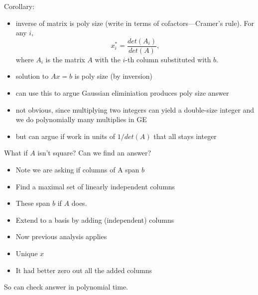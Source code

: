 \documentclass{article}
\begin{document}
Corollary:
\begin{itemize}
\item inverse of matrix is poly size (write in terms of cofactors---Cramer's rule). For any $i$,
\[
x_i^*=\frac{det(A_i)}{det(A)},
\]
where $A_i$ is the matrix $A$ with the $i$-th column substituted with $b$.
\item solution to $Ax=b$ is poly size (by inversion)
\item can use this to argue Gaussian eliminiation produces poly size
  answer 
\item not obvious, since multiplying two integers can yield a
  double-size integer and we do polynomially many multiplies in GE
\item but can argue if work in units of $1/det(A)$ that all stays integer
\end{itemize}

What if $A$ isn't square?  Can we find an answer?
\begin{itemize}
\item Note we are asking if columns of A span $b$
\item Find a maximal set of linearly independent columns
\item These span $b$ if $A$ does.
\item Extend to a basis by adding (independent) columns
\item Now previous analysis applies
\item Unique $x$
\item It had better zero out all the added columns
\end{itemize}

So can check answer in polynomial time.

\end{document}
